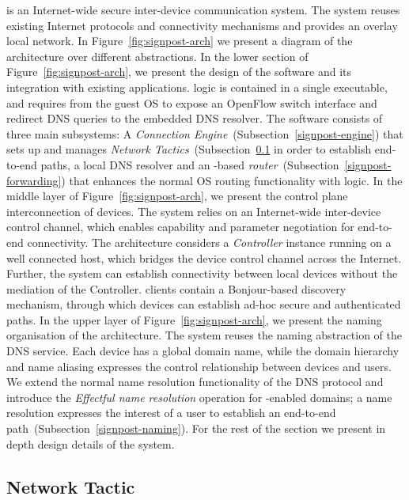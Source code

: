 \signpost is an Internet-wide secure inter-device communication system. The
system reuses existing Internet protocols and connectivity mechanisms and
provides an overlay local network. In Figure~\ref{fig:signpost-arch} we present
a diagram of the \signpost architecture over different abstractions. 
In the lower section of Figure~\ref{fig:signpost-arch}, we present the design of
the \signpost software and its integration with existing applications.
\signpost logic is contained in a single executable, and requires from the guest
OS to expose an OpenFlow switch interface and redirect DNS queries to the
embedded DNS resolver.  The software consists of three main subsystems: A
{\it Connection Engine}~(Subsection~\ref{signpost-engine}) that sets up and
manages {\it Network Tactics}~(Subsection~\ref{signpost-tactic} in order to establish
end-to-end paths, a local DNS resolver and an \of-based {\it \signpost
  router}~(Subsection~\ref{signpost-forwarding}) that enhances the normal OS
routing functionality with \signpost logic.  
In the middle layer of Figure~\ref{fig:signpost-arch}, we present the control
plane interconnection of \signpost devices. The system relies on an
Internet-wide inter-device control channel, which enables capability and
parameter negotiation for end-to-end connectivity. The architecture considers a
\emph{Controller \signpost} instance running on a well connected host, which
bridges the device control channel across the Internet.  Further, the system can
establish connectivity between local devices without the mediation of the
\signpost Controller.  \signpost clients contain a Bonjour-based discovery
mechanism, through which devices can establish ad-hoc secure and authenticated
paths.
In the upper layer of Figure~\ref{fig:signpost-arch}, we present the naming
organisation of the \signpost architecture. The system reuses the naming
abstraction of the DNS service. Each device has a global domain name, while the
domain hierarchy and name aliasing expresses the control relationship between
devices and users.  We extend the normal name resolution functionality of the
DNS protocol and introduce the  {\it Effectful name resolution} operation for
\signpost-enabled domains; a name resolution expresses the interest of a user to
establish an end-to-end path~(Subsection~\ref{signpost-naming}). For the rest of
the section we present in depth design details of the \signpost system. 

\subsection{Network Tactic} \label{signpost-tactic}

